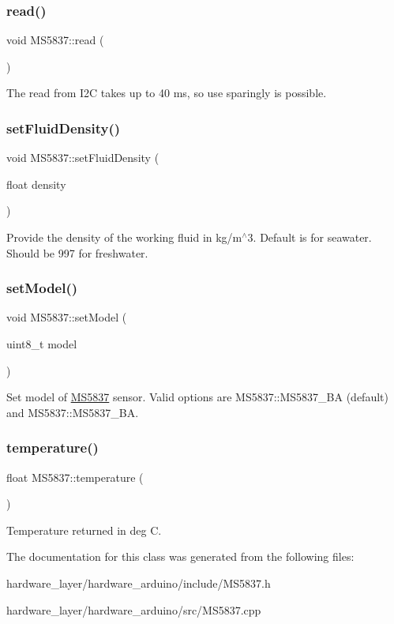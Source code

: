 \subsubsection{\texorpdfstring{read()}{read()}}
{\footnotesize\ttfamily void M\+S5837\+::read (\begin{DoxyParamCaption}{ }\end{DoxyParamCaption})}

The read from I2C takes up to 40 ms, so use sparingly is possible. \mbox{\label{classMS5837_a40ad0394fa84d49afa62ae63c411aa8f}} 
\subsubsection{\texorpdfstring{set\+Fluid\+Density()}{setFluidDensity()}}
{\footnotesize\ttfamily void M\+S5837\+::set\+Fluid\+Density (\begin{DoxyParamCaption}\item[{float}]{density }\end{DoxyParamCaption})}

Provide the density of the working fluid in kg/m$^\wedge$3. Default is for seawater. Should be 997 for freshwater. \mbox{\label{classMS5837_af8b0b1e168f39a9b99fa5918a6ef8f04}} 
\subsubsection{\texorpdfstring{set\+Model()}{setModel()}}
{\footnotesize\ttfamily void M\+S5837\+::set\+Model (\begin{DoxyParamCaption}\item[{uint8\+\_\+t}]{model }\end{DoxyParamCaption})}

Set model of \hyperlink{classMS5837}{M\+S5837} sensor. Valid options are M\+S5837\+::\+M\+S5837\+\_\+BA (default) and M\+S5837\+::\+M\+S5837\+\_\+BA. \mbox{\label{classMS5837_a554d181ffc4329c1e292ca87e0a810f0}} 
\subsubsection{\texorpdfstring{temperature()}{temperature()}}
{\footnotesize\ttfamily float M\+S5837\+::temperature (\begin{DoxyParamCaption}{ }\end{DoxyParamCaption})}

Temperature returned in deg C. 

The documentation for this class was generated from the following files\+:\begin{DoxyCompactItemize}
\item 
hardware\+\_\+layer/hardware\+\_\+arduino/include/M\+S5837.\+h\item 
hardware\+\_\+layer/hardware\+\_\+arduino/src/M\+S5837.\+cpp\end{DoxyCompactItemize}
